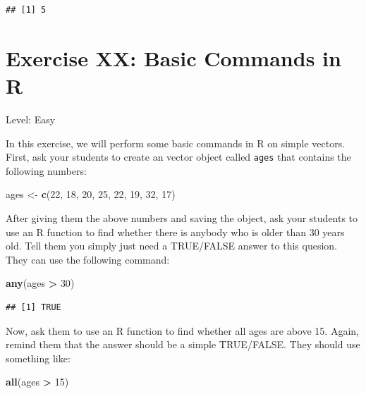 \documentclass[]{book}
\newenvironment{Shaded}{\begin{snugshade}}{\end{snugshade}}
\newcommand{\DecValTok}[1]{\textcolor[rgb]{0.00,0.00,0.81}{#1}}
\newcommand{\KeywordTok}[1]{\textcolor[rgb]{0.13,0.29,0.53}{\textbf{#1}}}
\newcommand{\NormalTok}[1]{#1}
\newcommand{\OperatorTok}[1]{\textcolor[rgb]{0.81,0.36,0.00}{\textbf{#1}}}
\newcommand{\StringTok}[1]{\textcolor[rgb]{0.31,0.60,0.02}{#1}}
\begin{document}
\begin{verbatim}
## [1] 5
\end{verbatim}

\hypertarget{exercise-xx-basic-commands-in-r}{%
\section*{Exercise XX: Basic Commands in R}\label{exercise-xx-basic-commands-in-r}}

Level: Easy

In this exercise, we will perform some basic commands in R on simple vectors. First, ask your students to create an vector object called \texttt{ages} that contains the following numbers:

\begin{Shaded}
\begin{Highlighting}[]
\NormalTok{ages <-}\StringTok{ }\KeywordTok{c}\NormalTok{(}\DecValTok{22}\NormalTok{, }\DecValTok{18}\NormalTok{, }\DecValTok{20}\NormalTok{, }\DecValTok{25}\NormalTok{, }\DecValTok{22}\NormalTok{, }\DecValTok{19}\NormalTok{, }\DecValTok{32}\NormalTok{, }\DecValTok{17}\NormalTok{)}
\end{Highlighting}
\end{Shaded}

After giving them the above numbers and saving the object, ask your students to use an R function to find whether there is anybody who is older than 30 years old. Tell them you simply just need a TRUE/FALSE answer to this quesion. They can use the following command:

\begin{Shaded}
\begin{Highlighting}[]
\KeywordTok{any}\NormalTok{(ages }\OperatorTok{>}\StringTok{ }\DecValTok{30}\NormalTok{)}
\end{Highlighting}
\end{Shaded}

\begin{verbatim}
## [1] TRUE
\end{verbatim}

Now, ask them to use an R function to find whether all ages are above 15. Again, remind them that the answer should be a simple TRUE/FALSE. They should use something like:

\begin{Shaded}
\begin{Highlighting}[]
\KeywordTok{all}\NormalTok{(ages }\OperatorTok{>}\StringTok{ }\DecValTok{15}\NormalTok{)}
\end{Highlighting}
\end{Shaded}
\end{document}
